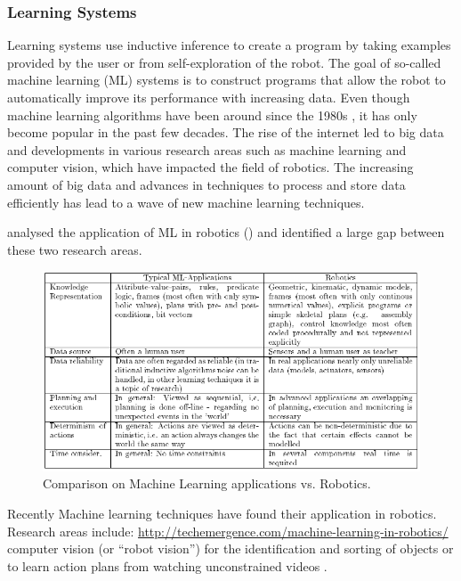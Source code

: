 \subsubsection{Learning Systems}\label{sssec:Learning Systems}
Learning systems use inductive inference to create a program by taking examples provided by the user or from self-exploration of the robot. The goal of so-called machine learning (ML) systems is to construct programs that allow the robot to automatically improve its performance with increasing data. Even though machine learning algorithms have been around since the 1980s \cite{}, it has only become popular in the past few decades. The rise of the internet led to big data and developments in various research areas such as machine learning and computer vision, which have impacted the field of robotics.
The increasing amount of big data and advances in techniques to process and store data efficiently has lead to a wave of new machine learning techniques. 

\cite{Kreuziger1992} analysed the application of ML in robotics () and identified a large gap between these two research areas.


 \begin{figure}[ht]
 \centering
\includegraphics[width=\linewidth]{figures/Kreuziger1992-Comparison ML Robotics}
 \caption{Comparison on Machine Learning applications vs. Robotics. \cite{Kreuziger1992}}
 \label{fig:MLvsRobotics}
\end{figure} 

\cite{kaiser1995obtaining} 

Recently Machine learning techniques have found their application in robotics. Research areas include: \url{http://techemergence.com/machine-learning-in-robotics/}\\
computer vision (or ``robot vision'') for the identification and sorting of objects \cite{stager2013computer} or to learn action plans from watching unconstrained videos \cite{Yang2015}.

